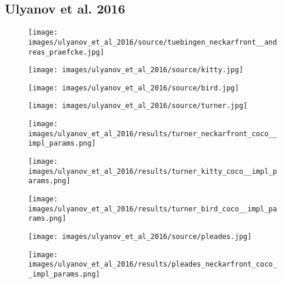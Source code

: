 \subsection{Ulyanov et al. 2016}

\begin{figure}[H]
	\begin{minipage}[t]{0.24\textwidth}
		\centering
		\hfill
	\end{minipage}
	\hfill%
	\begin{minipage}[t]{0.24\textwidth}
		\centering
		\texttt{[image: images/ulyanov\_et\_al\_2016/source/tuebingen\_neckarfront\_\_andreas\_praefcke.jpg]}
	\end{minipage}
	\hfill%
	\begin{minipage}[t]{0.24\textwidth}
		\centering
		\texttt{[image: images/ulyanov\_et\_al\_2016/source/kitty.jpg]}
	\end{minipage}
	\hfill%
	\begin{minipage}[t]{0.24\textwidth}
		\centering
		\texttt{[image: images/ulyanov\_et\_al\_2016/source/bird.jpg]}
	\end{minipage}
	\hfill%
	\begin{minipage}[t]{0.24\textwidth}
		\centering
		\texttt{[image: images/ulyanov\_et\_al\_2016/source/turner.jpg]}
	\end{minipage}
	\hfill%
	\begin{minipage}[t]{0.24\textwidth}
		\centering
		\texttt{[image: images/ulyanov\_et\_al\_2016/results/turner\_neckarfront\_coco\_\_impl\_params.png]}
	\end{minipage}
	\hfill%
	\begin{minipage}[t]{0.24\textwidth}
		\centering
		\texttt{[image: images/ulyanov\_et\_al\_2016/results/turner\_kitty\_coco\_\_impl\_params.png]}
	\end{minipage}
	\hfill%
	\begin{minipage}[t]{0.24\textwidth}
		\centering
		\texttt{[image: images/ulyanov\_et\_al\_2016/results/turner\_bird\_coco\_\_impl\_params.png]}
	\end{minipage}
	\hfill%
	\begin{minipage}[t]{0.24\textwidth}
		\centering
		\texttt{[image: images/ulyanov\_et\_al\_2016/source/pleades.jpg]}
	\end{minipage}
	\hfill%
	\begin{minipage}[t]{0.24\textwidth}
		\centering
		\texttt{[image: images/ulyanov\_et\_al\_2016/results/pleades\_neckarfront\_coco\_\_impl\_params.png]}

\end{minipage}
\end{figure}

